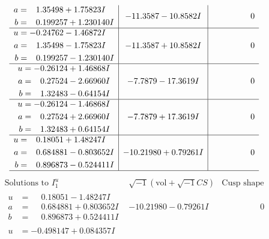 \documentclass[1p]{elsarticle_modified}
\theoremstyle{definition}
\newcommand{\I}{\sqrt{-1}}
\begin{document}
$$\begin{array}{c|c|c}
\begin{aligned}
a &= \phantom{-}1.35498 + 1.75823 I \\
b &= \phantom{-}0.199257 + 1.230140 I\end{aligned}
 & -11.3587 - 10.8582 I & \phantom{-0.000000 } 0 \\ \hline\begin{aligned}
u &= -0.24762 - 1.46872 I \\
a &= \phantom{-}1.35498 - 1.75823 I \\
b &= \phantom{-}0.199257 - 1.230140 I\end{aligned}
 & -11.3587 + 10.8582 I & \phantom{-0.000000 } 0 \\ \hline\begin{aligned}
u &= -0.26124 + 1.46868 I \\
a &= \phantom{-}0.27524 - 2.66960 I \\
b &= \phantom{-}1.32483 - 0.64154 I\end{aligned}
 & -7.7879 - 17.3619 I & \phantom{-0.000000 } 0 \\ \hline\begin{aligned}
u &= -0.26124 - 1.46868 I \\
a &= \phantom{-}0.27524 + 2.66960 I \\
b &= \phantom{-}1.32483 + 0.64154 I\end{aligned}
 & -7.7879 + 17.3619 I & \phantom{-0.000000 } 0 \\ \hline\begin{aligned}
u &= \phantom{-}0.18051 + 1.48247 I \\
a &= \phantom{-}0.684881 - 0.803652 I \\
b &= \phantom{-}0.896873 - 0.524411 I\end{aligned}
 & -10.21980 + 0.79261 I & \phantom{-0.000000 } 0\\
 \hline 
 \end{array}$$\newpage$$\begin{array}{c|c|c}  
\text{Solutions to }I^u_{1}& \I (\text{vol} + \sqrt{-1}CS) & \text{Cusp shape}\\
 \hline 
\begin{aligned}
u &= \phantom{-}0.18051 - 1.48247 I \\
a &= \phantom{-}0.684881 + 0.803652 I \\
b &= \phantom{-}0.896873 + 0.524411 I\end{aligned}
 & -10.21980 - 0.79261 I & \phantom{-0.000000 } 0 \\ \hline\begin{aligned}
u &= -0.498147 + 0.084357 I \\

\end{aligned}
\end{array}$$
\end{document}

